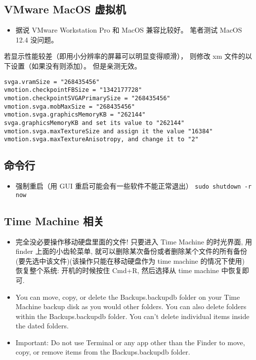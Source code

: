 \subsection{VMware MacOS 虚拟机}
\begin{itemize}
\item 据说 VMware Workstation Pro 和 MacOS 兼容比较好。 笔者测试 MacOS 12.4 没问题。
\end{itemize}

若显示性能较差（即用小分辨率的屏幕可以明显变得顺滑）， 则修改 xm 文件的以下设置（如果没有则添加）。 但是亲测无效。
\begin{lstlisting}[language=none]
svga.vramSize = "268435456"
vmotion.checkpointFBSize = "1342177728"
vmotion.checkpointSVGAPrimarySize = "268435456"
vmotion.svga.mobMaxSize = "268435456"
vmotion.svga.graphicsMemoryKB = "262144"
svga.graphicsMemoryKB and set its value to "262144"
vmotion.svga.maxTextureSize and assign it the value "16384"
vmotion.svga.maxTextureAnisotropy, and change it to "2"
\end{lstlisting}

\subsection{命令行}
\begin{itemize}
\item 强制重启（用 GUI 重启可能会有一些软件不能正常退出） \verb|sudo shutdown -r now|
\end{itemize}

\subsection{Time Machine 相关}
\begin{itemize}
\item 完全没必要操作移动硬盘里面的文件! 只要进入 Time Machine 的时光界面, 用 finder 上面的小齿轮菜单, 就可以删除某次备份或者删除某个文件的所有备份 (要先选中该文件)(该操作只能在移动硬盘作为 time machine 的情况下使用)
恢复整个系统: 开机的时候按住 Cmd+R, 然后选择从 time machine 中恢复即可.
\item You can move, copy, or delete the Backups.backupdb folder on your Time Machine backup disk as you would other folders. You can also delete folders within the Backups.backupdb folder. You can’t delete individual items inside the dated folders.
\item Important: Do not use Terminal or any app other than the Finder to move, copy, or remove items from the Backups.backupdb folder.
\end{itemize}

